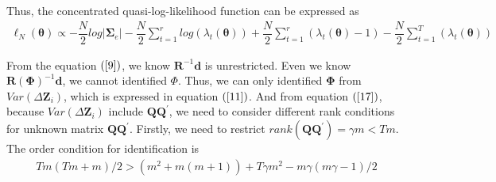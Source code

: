 \documentclass[12pt,a4paper,hyperref]{article}
\begin{document}
Thus, the concentrated quasi-log-likelihood function can be expressed as
\begin{align}
\ell_{N} ( \boldsymbol{\theta})\propto -\dfrac{N}{2}log \vert \boldsymbol{\Sigma}_{e}   \vert-\dfrac{N}{2}\sum^{r}_{t=1}log \left( \lambda_{t}(\boldsymbol{\theta}) \right) +\dfrac{N}{2} \sum_{t=1}^{r}\left(\lambda_{t}(\boldsymbol{\theta})-1  \right)-\dfrac{N}{2}\sum_{t=1}^{T} \left( \lambda_{t}(\boldsymbol{\theta}) \right) \label{29}
\end{align}







From the equation $(\ref{9})$, we know $\boldsymbol{R}^{-1}\boldsymbol{d}$ is unrestricted. Even we know $\boldsymbol{R\left(\Phi\right)}^{-1}\boldsymbol{d}$, we cannot identified $\Phi$. Thus, we can only identified $\boldsymbol{\Phi}$ from $Var(\Delta \boldsymbol{Z}_{i})$, which is expressed in equation $(\ref{11})$. And from equation  $(\ref{17})$, because $Var(\Delta \boldsymbol{Z}_{i})$ include $\boldsymbol{QQ^{'}}$, we need to consider different rank conditions for unknown matrix $\boldsymbol{QQ}^{'}$. Firstly, we need to restrict $rank\left( \boldsymbol{QQ}^{'}\right)=\gamma m < Tm$. The order condition for identification is
\begin{align}
Tm(Tm+m)/2>(m^{2}+m(m+1))+T\gamma m^{2}-m \gamma(m \gamma-1)/2
\end{align}
\end{document}
